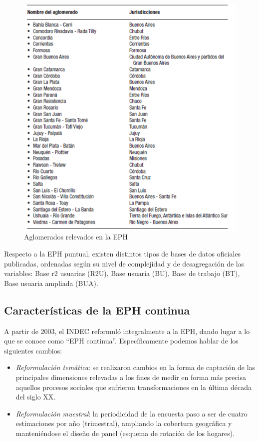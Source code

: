 \documentclass[
]{book}
\begin{document}
\begin{figure}
\centering
\includegraphics{imagenes/aglomerados.png}
\caption{Aglomerados relevados en la EPH}
\end{figure}

Respecto a la EPH puntual, existen distintos tipos de bases de datos oficiales publicadas, ordenadas según su nivel de complejidad y de desagregación de las variables: Base r2 usuarias (R2U), Base usuaria (BU), Base de trabajo (BT), Base usuaria ampliada (BUA).

\hypertarget{caracteruxedsticas-de-la-eph-continua}{%
\subsection{Características de la EPH continua}\label{caracteruxedsticas-de-la-eph-continua}}

A partir de 2003, el INDEC reformuló integralmente a la EPH, dando lugar a lo que se conoce como ``EPH continua''. Específicamente podemos hablar de los siguientes cambios:

\begin{itemize}
\item
  \emph{Reformulación temática}: se realizaron cambios en la forma de captación de las principales dimensiones relevadas a los fines de medir en forma más precisa aquellos procesos sociales que sufrieron transformaciones en la última década del siglo XX.
\item
  \emph{Reformulación muestral}: la periodicidad de la encuesta paso a ser de cuatro estimaciones por año (trimestral), ampliando la cobertura geográfica y manteniéndose el diseño de panel (esquema de rotación de los hogares).
\end{itemize}
\end{document}
